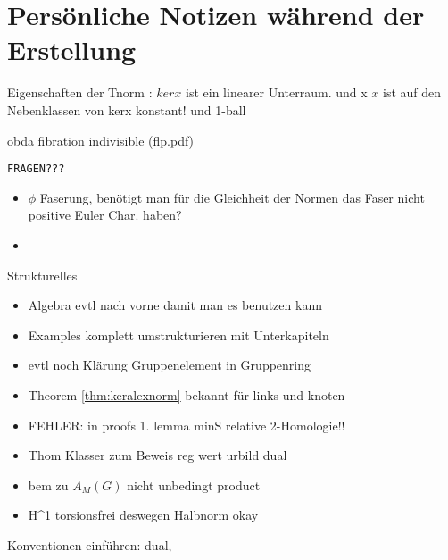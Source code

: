 
\section{Persönliche Notizen während der Erstellung}
	

	Eigenschaften der Tnorm : $kerx$ ist ein linearer Unterraum. und x $x$ ist auf den Nebenklassen von kerx konstant! und 1-ball


	obda fibration indivisible (flp.pdf)

\texttt{FRAGEN???}
	\begin{itemize}
		\item $\phi$ Faserung, benötigt man für die Gleichheit der Normen das Faser nicht positive Euler Char. haben?
		\item 
	\end{itemize}

	{Strukturelles}
	\begin{itemize}
		\item Algebra evtl nach vorne damit man es benutzen kann
		\item Examples komplett umstrukturieren mit Unterkapiteln
		\item evtl noch Klärung Gruppenelement in Gruppenring
		\item Theorem \ref{thm:keralexnorm} bekannt für links und knoten
		\item FEHLER: in proofs 1. lemma minS relative 2-Homologie!!
		\item Thom Klasser zum Beweis reg wert urbild dual
		\item bem zu $A_M(G)$ nicht unbedingt product
		\item H^1 torsionsfrei deswegen Halbnorm okay
	\end{itemize}

	Konventionen einführen: dual,

